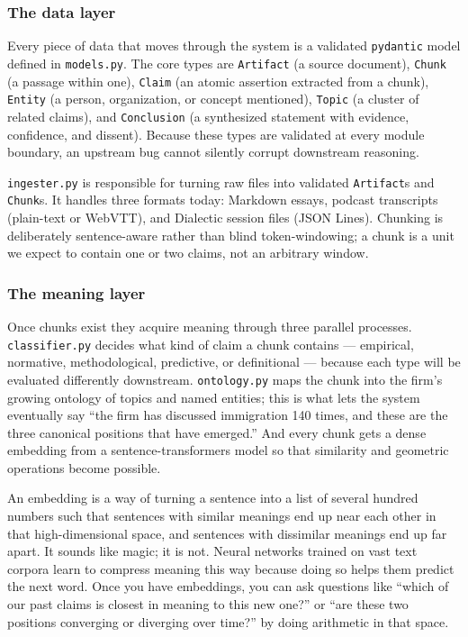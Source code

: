 \documentclass[11pt]{article}
\begin{document}
\subsubsection{The data layer}

Every piece of data that moves through the system is a validated \texttt{pydantic} model defined in \texttt{models.py}. The core types are \texttt{Artifact} (a source document), \texttt{Chunk} (a passage within one), \texttt{Claim} (an atomic assertion extracted from a chunk), \texttt{Entity} (a person, organization, or concept mentioned), \texttt{Topic} (a cluster of related claims), and \texttt{Conclusion} (a synthesized statement with evidence, confidence, and dissent). Because these types are validated at every module boundary, an upstream bug cannot silently corrupt downstream reasoning.

\texttt{ingester.py} is responsible for turning raw files into validated \texttt{Artifact}s and \texttt{Chunk}s. It handles three formats today: Markdown essays, podcast transcripts (plain-text or WebVTT), and Dialectic session files (JSON Lines). Chunking is deliberately sentence-aware rather than blind token-windowing; a chunk is a unit we expect to contain one or two claims, not an arbitrary window.

\subsubsection{The meaning layer}

Once chunks exist they acquire meaning through three parallel processes. \texttt{classifier.py} decides what kind of claim a chunk contains --- empirical, normative, methodological, predictive, or definitional --- because each type will be evaluated differently downstream. \texttt{ontology.py} maps the chunk into the firm's growing ontology of topics and named entities; this is what lets the system eventually say ``the firm has discussed immigration 140 times, and these are the three canonical positions that have emerged.'' And every chunk gets a dense embedding from a sentence-transformers model so that similarity and geometric operations become possible.

\begin{intuitionbox}
An embedding is a way of turning a sentence into a list of several hundred numbers such that sentences with similar meanings end up near each other in that high-dimensional space, and sentences with dissimilar meanings end up far apart. It sounds like magic; it is not. Neural networks trained on vast text corpora learn to compress meaning this way because doing so helps them predict the next word. Once you have embeddings, you can ask questions like ``which of our past claims is closest in meaning to this new one?'' or ``are these two positions converging or diverging over time?'' by doing arithmetic in that space.
\end{intuitionbox}
\end{document}
